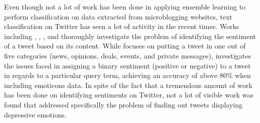 Even though not a lot of work has been done in applying ensemble learning to perform classification on data extracted from microblogging websites, text classification on Twitter has seen a lot of activity in the recent times. Works including \cite{sriram2010short}, \cite{go2009twitter}, \cite{dodds2011temporal}, \cite{golder2011diurnal} and \cite{jiang2011target} thoroughly investigate the problem of identifying the sentiment of a tweet based on its content. While \cite{sriram2010short} focuses on putting a tweet in one out of five categories (news, opinions, deals, events, and private messages), \cite{go2009twitter} investigates the issues faced in assigning a binary sentiment (positive or negative) to a tweet in regards to a particular query term, achieving an accuracy of above 80\% when including emoticons data. In spite of the fact that a tremendous amount of work has been done on identifying sentiments on Twitter, not a lot of visible work was found that addressed specifically the problem of finding out tweets displaying depressive emotions.\\
